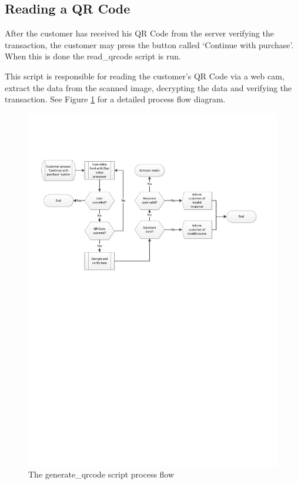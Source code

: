 \subsection{Reading a QR Code}

After the customer has received his QR Code from the server verifying the
transaction, the customer may press the button called `Continue with purchase'.
When this is done the read\_qrcode script is run.

This script is responsible for reading the customer's QR Code via a web cam,
extract the data from the scanned image, decrypting the data and verifying the
transaction. See Figure \ref{fig:read-qrcode-processflow} for a detailed process
flow diagram.

\begin{figure}
 \centering 
 \includegraphics[clip=true, trim
 = 0 460 0 100, scale=0.75]{read_qrcode_processflow}
 \caption{The generate\_qrcode script process flow}
 \label{fig:read-qrcode-processflow}
\end{figure}

